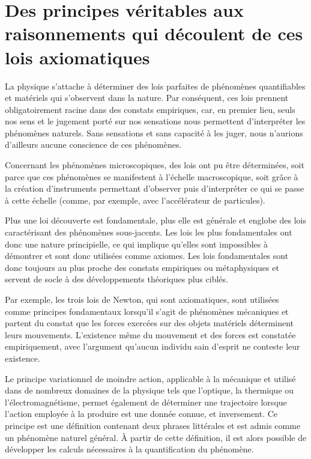 \chapter{Des principes véritables aux raisonnements qui découlent de ces lois axiomatiques}

La physique s’attache à déterminer des lois parfaites de phénomènes quantifiables et matériels qui s'observent dans la nature. Par conséquent, ces lois prennent obligatoirement racine dans des constats empiriques, car, en premier lieu, seuls nos sens et le jugement porté sur nos sensations nous permettent d’interpréter les phénomènes naturels. Sans sensations et sans capacité à les juger, nous n’aurions d’ailleurs aucune conscience de ces phénomènes.

Concernant les phénomènes microscopiques, des lois ont pu être déterminées, soit parce que ces phénomènes se manifestent à l’échelle macroscopique, soit grâce à la création d’instruments permettant d’observer puis d’interpréter ce qui se passe à cette échelle (comme, par exemple, avec l'accélérateur de particules).

Plus une loi découverte est fondamentale, plus elle est générale et englobe des lois caractérisant des phénomènes sous-jacents. Les lois les plus fondamentales ont donc une nature principielle, ce qui implique qu’elles sont impossibles à démontrer et sont donc utilisées comme axiomes. Les lois fondamentales sont donc toujours au plus proche des constats empiriques ou métaphysiques et servent de socle à des développements théoriques plus ciblés.

Par exemple, les trois lois de Newton, qui sont axiomatiques, sont utilisées comme principes fondamentaux lorsqu’il s'agit de phénomènes mécaniques et partent du constat que les forces exercées sur des objets matériels déterminent leurs mouvements. L’existence même du mouvement et des forces est constatée empiriquement, avec l'argument qu’aucun individu sain d’esprit ne conteste leur existence.

Le principe variationnel de moindre action, applicable à la mécanique et utilisé dans de nombreux domaines de la physique tels que l’optique, la thermique ou l’électromagnétisme, permet également de déterminer une trajectoire lorsque l’action employée à la produire est une donnée connue, et inversement. Ce principe est une définition contenant deux phrases littérales et est admis comme un phénomène naturel général. À partir de cette définition, il est alors possible de développer les calculs nécessaires à la quantification du phénomène.

